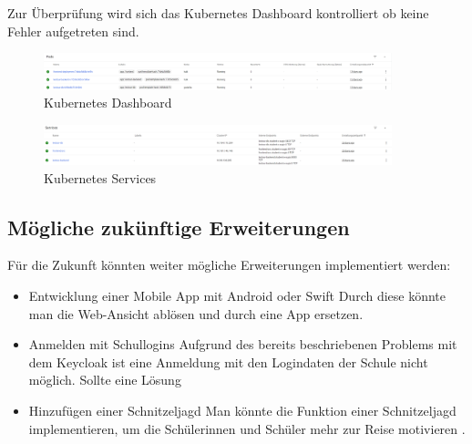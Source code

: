 \newpage

Zur Überprüfung wird sich das Kubernetes Dashboard kontrolliert ob keine Fehler aufgetreten sind.

\begin{figure}
    \centering
    \includegraphics[width=0.9\textwidth]{pics/kubernetes_dashboard.png}
    \caption{Kubernetes Dashboard}
    \label{fig:Kubernetes_dashboard}
\end{figure}
\begin{figure}
    \centering
    \includegraphics[width=0.9\textwidth]{pics/kubernetes_services.png}
    \caption{Kubernetes Services}
    \label{fig:Kubernetes_dashboard_Services}
\end{figure}


\subsection{Mögliche zukünftige Erweiterungen}

Für die Zukunft könnten weiter mögliche Erweiterungen implementiert werden:

\begin{itemize}
    \item Entwicklung einer Mobile App mit Android oder Swift
    Durch diese könnte man die Web-Ansicht ablösen und durch eine App ersetzen.
    \item Anmelden mit Schullogins
    Aufgrund des bereits beschriebenen Problems mit dem Keycloak ist eine Anmeldung mit den Logindaten der Schule nicht möglich. Sollte eine Lösung 
    \item Hinzufügen einer Schnitzeljagd
    Man könnte die Funktion einer Schnitzeljagd implementieren, um die Schülerinnen und Schüler mehr zur Reise motivieren .
\end{itemize}
